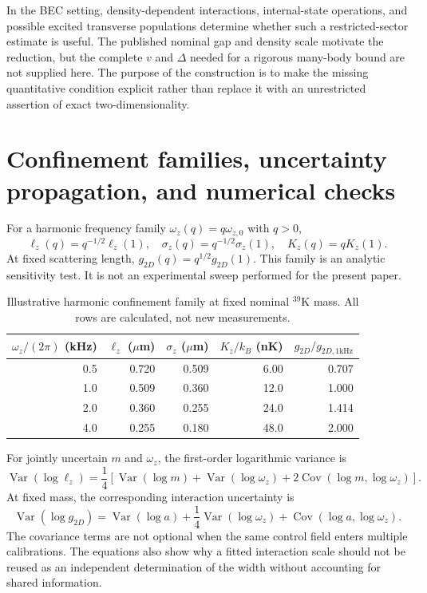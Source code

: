 \documentclass[11pt,a4paper]{article}
\theoremstyle{definition}
\theoremstyle{remark}
\newcommand{\Var}{\operatorname{Var}}
\newcommand{\Cov}{\operatorname{Cov}}
\newcommand{\lop}{\ell_z}
\begin{document}
In the BEC setting, density-dependent interactions, internal-state operations, and possible excited transverse populations determine whether such a restricted-sector estimate is useful. The published nominal gap and density scale motivate the reduction, but the complete $v$ and $\Delta$ needed for a rigorous many-body bound are not supplied here. The purpose of the construction is to make the missing quantitative condition explicit rather than replace it with an unrestricted assertion of exact two-dimensionality.

\section{Confinement families, uncertainty propagation, and numerical checks}
\label{app:numeric}
For a harmonic frequency family $\omega_z(q)=q\omega_{z,0}$ with $q>0$,
\begin{equation}
 \lop(q)=q^{-1/2}\lop(1),\quad
 \sigma_z(q)=q^{-1/2}\sigma_z(1),\quad
 K_z(q)=qK_z(1).
 \label{eq:q_family}
\end{equation}
At fixed scattering length, $g_{2D}(q)=q^{1/2}g_{2D}(1)$. This family is an analytic sensitivity test. It is not an experimental sweep performed for the present paper.

\begin{table}[htbp]
\centering\small
\caption{Illustrative harmonic confinement family at fixed nominal $^{39}\mathrm K$ mass. All rows are calculated, not new measurements.}
\label{tab:family}
\begin{tabular}{@{}rrrrr@{}}
\toprule
$\omega_z/(2\pi)$ (kHz)&$\lop$ ($\mu$m)&$\sigma_z$ ($\mu$m)&$K_z/k_B$ (nK)&$g_{2D}/g_{2D,1\mathrm{kHz}}$\\\midrule
0.5&0.720&0.509&6.00&0.707\\
1.0&0.509&0.360&12.0&1.000\\
2.0&0.360&0.255&24.0&1.414\\
4.0&0.255&0.180&48.0&2.000\\
\bottomrule
\end{tabular}
\end{table}

For jointly uncertain $m$ and $\omega_z$, the first-order logarithmic variance is
\begin{equation}
 \Var(\log\lop)=\frac14\left[
 \Var(\log m)+\Var(\log\omega_z)
 +2\Cov(\log m,\log\omega_z)\right].
 \label{eq:width_uncertainty}
\end{equation}
At fixed mass, the corresponding interaction uncertainty is
\begin{equation}
 \Var(\log g_{2D})
 =\Var(\log a)+\frac14\Var(\log\omega_z)
 +\Cov(\log a,\log\omega_z).
 \label{eq:coupling_uncertainty}
\end{equation}
The covariance terms are not optional when the same control field enters multiple calibrations. The equations also show why a fitted interaction scale should not be reused as an independent determination of the width without accounting for shared information.
\end{document}
